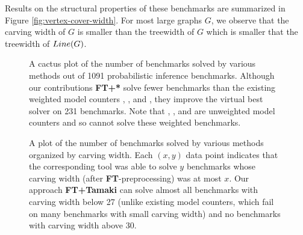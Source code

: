 Results on the structural properties of these benchmarks are summarized in Figure \ref{fig:vertex-cover-width}. 
For most large graphs $G$, we observe that the carving width of $G$ is smaller than the treewidth of $G$ which is smaller that the treewidth of $Line(G)$. 



\begin{figure}[t]
	\centering
	
	\caption{\label{fig:cachet-cactus} A cactus plot of the number of benchmarks solved by various methods out of 1091 probabilistic inference benchmarks. Although our contributions \textbf{FT+*} solve fewer benchmarks than the existing weighted model counters , , and , they improve the virtual best solver on 231 benchmarks. Note that , , and  are unweighted model counters and so cannot solve these weighted benchmarks.}
\end{figure}

\begin{figure}[t]
	\centering
	
	\caption{\label{fig:cachet-carving-cactus} A plot of the number of benchmarks solved by various methods organized by carving width. Each $(x,y)$ data point indicates that the corresponding tool was able to solve $y$ benchmarks whose carving width (after \textbf{FT}-preprocessing) was at most $x$. Our approach \textbf{FT+Tamaki} can solve almost all benchmarks with carving width below 27 (unlike existing model counters, which fail on many benchmarks with small carving width) and no benchmarks with carving width above 30.}
\end{figure}

